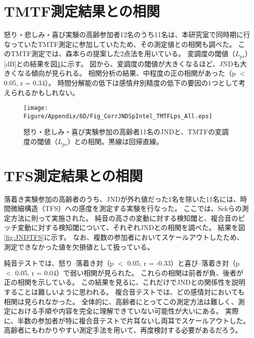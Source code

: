\section{TMTF測定結果との相関}
怒り・悲しみ・喜び実験の高齢参加者12名のうち11名は、本研究室で同時期に行なっていたTMTF測定に参加していたため、その測定値との相関も調べた。
このTMTF測定では、森本らの提案した2点法を用いている\cite{morimoto2019Two-PointTMTF}。
変調度の閾値（$L_{ps}$）[dB]との結果を図\ref{fig:JNDTMTF}に示す。
図から、変調度の閾値が大きくなるほど、JNDも大きくなる傾向が見られる。
相関分析の結果、中程度の正の相関があった（p $<$ 0.05, r = 0.34）。
時間分解能の低下は感情弁別精度の低下の要因の1つとして考えられるかもしれない。


\begin{figure}[htbp]
  \vspace{40pt}
  \centering
  \texttt{[image: Figure/Appendix/6D/Fig\_CorrJNDSpIntel\_TMTFLps\_All.eps]}
  \caption{怒り・悲しみ・喜び実験参加の高齢者11名のJNDと、TMTFの変調度の閾値（$L_{ps}$）との相関。黒線は回帰直線。}
  \label{fig:JNDTMTF}
\end{figure}




\section{TFS測定結果との相関}
落着き実験参加の高齢者のうち、JNDが外れ値だった1名を除いた11名には、時間微細構造（TFS）への感度を測定する実験を行なった。
ここでは、Sekらの測定方法\cite{Sek2022Guide,Sek2012TFS1}に則って実施された。
純音の高さの変動に対する検知閾と、複合音のピッチ変動に対する検知閾について、それぞれJNDとの相関を調べた。
結果を図\ref{fig:JNDTFS}に示す。
なお、複数の参加者においてスケールアウトしたため、測定できなかった値を欠損値として扱っている。

純音テストでは、怒り--落着き対（p $<$ 0.05, r = -0.33）と喜び--落着き対（p $<$ 0.05, r = 0.04）で弱い相関が見られた。
これらの相関は前者が負、後者が正の相関を示している。
この結果を見るに、これだけでJNDとの関係性を説明することは難しいように思われる。
複合音テストでは、どの感情対においても相関は見られなかった。
全体的に、高齢者にとってこの測定方法は難しく、測定における手順や内容を完全に理解できていない可能性が大いにある。
実際に、半数の参加者が特に複合音テストで片耳ないし両耳でスケールアウトした。
高齢者にもわかりやすい測定手法を用いて、再度検討する必要があるだろう。



